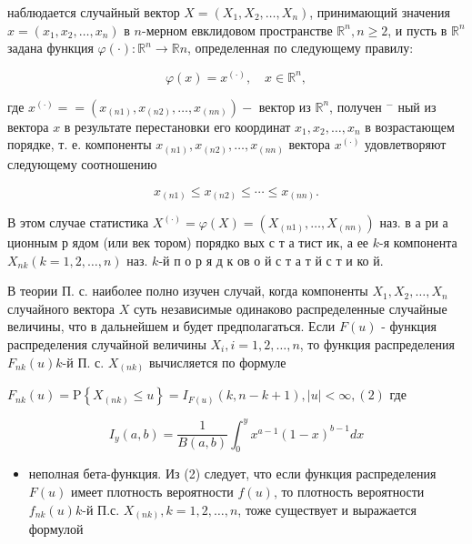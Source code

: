 \documentclass[10pt]{article}
\begin{document}
наблюдается случайный вектор $X=\left(X_{1}, X_{2}, \ldots, X_{n}\right)$, принимающий значения $x=\left(x_{1}, x_{2}, \ldots, x_{n}\right)$ в $n$-мерном евклидовом пространстве $\mathbb{R}^{n}, n \geqslant 2$, и пусть в $\mathbb{R}^{n}$ задана функция $\varphi(\cdot): \mathbb{R}^{n} \rightarrow \mathbb{R} n$, определенная по следующему правилу:



\[

\varphi(x)=x^{(\cdot)}, \quad x \in \mathbb{R}^{n},

\]



где $x^{(\cdot)}==\left(x_{(n 1)}, x_{(n 2)}, \ldots, x_{(n n)}\right)-$ вектор из $\mathbb{R}^{n}$, получен ${ }^{-}$ ный из вектора $x$ в результате перестановки его координат $x_{1}, x_{2}, \ldots, x_{n}$ в возрастающем порядке, т. е. компоненты $x_{(n 1)}, x_{(n 2)}, \ldots, x_{(n n)}$ вектора $x^{(\cdot)}$ удовлетворяют следующему соотношению



\[

x_{(n 1)} \leqslant x_{(n 2)} \leqslant \cdots \leqslant x_{(n n)} .

\]



В этом случае статистика $X^{(\cdot)}=\varphi(X)=\left(X_{(n 1)}, \ldots, X_{(n n)}\right)$ наз. в а ри а ционным р ядом (или век тором) порядко вых с т а тист ик, а ее $k$-я компонента $X_{n k}(k=1,2, \ldots, n)$ наз. $k$-й п о р я д к ов о й с т а т й с т и ко й.



В теории П. с. наиболее полно изучен случай, когда компоненты $X_{1}, X_{2}, \ldots, X_{n}$ случайного вектора $X$ суть независимые одинаково распределенные случайные величины, что в дальнейшем и будет предполагаться. Если $F(u)$ - функция распределения случайной величины $X_{i}, i=1,2, \ldots, n$, то функция распределения $F_{n k}(u) k$-й П. с. $X_{(n k)}$ вычисляется по формуле



$F_{n k}(u)=\mathrm{P}\left\{X_{(n k)} \leqslant u\right\}=I_{F(u)}(k, n-k+1),|u|<\infty,(2)$ где



\[

I_{y}(a, b)=\frac{1}{B(a, b)} \int_{0}^{y} x^{a-1}(1-x)^{b-1} d x

\]



\begin{itemize}

  \item неполная бета-функция. Из (2) следует, что если функция распределения $F(u)$ имеет плотность вероятности $f(u)$, то плотность вероятности $f_{n k}(u) k$-й П.с. $X_{(n k)}, k=1,2, \ldots, n$, тоже существует и выражается формулой

\end{itemize}
\end{document}
